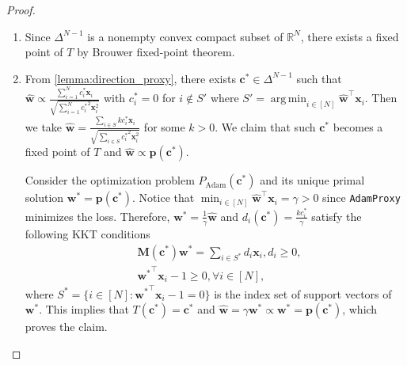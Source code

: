 \documentclass{article} %
\theoremstyle{plain}
\theoremstyle{definition}
\theoremstyle{remark}
\newcommand{\R}{\mathbb{R}}
\DeclareMathOperator*{\argmin}{arg\,min}
\def\bx{{\mathbf x}}
\def\bc{{\mathbf c}}
\def\bp{{\mathbf p}}
\def\bw{{\mathbf w}}
\def\bd{{\mathbf d}}
\def\bM{{\mathbf M}}
\begin{document}
\begin{proof}
\begin{enumerate}[label=(\alph*)]
    Let $\mathbf{X}$ be a matrix whose columns are the support vectors of $\bw^*$. On $\bc\in \Delta^{N-1} \cap B_{\delta}(\bc_0)$, KKT conditions tells us that
    \begin{align*}
        \bM(\mathbf{c})\bp(\mathbf{c}) = \sum_{i \in S(\bp(\bc))} d_i(\bc) \bx_i \overset{(*)}{=} \sum_{i \in S(\bw^*)} d_i(\bc) \bx_i =\mathbf{X}\bd(\bc) \\
        \overset{(**)}{\Leftrightarrow} \bd(\bc) = (\mathbf{X}^\top|_{\operatorname{im}\mathbf{X}^\top})^{-1}\bM(\mathbf{c})\mathbf{p}(\mathbf{c}),
    \end{align*}
    where $(*)$ is from $S(\bp(\bc)) \subseteq S(\bw^*)$ and $(**)$ is from the linear independence of columns of $\mathbf{X}$. Notice that $\bM(\bc)$ and $\bw^*(\bc)$ are continuous on $\bc = \bc_0$, which implies that $\bd(\bc)$ is continuous on $\bc = \bc_0$.
    
    Since at least one of the dual solutions is strictly positive, $\bd$ is a continuous map from $\Delta^{N-1}$ to $\mathbb{R}_{\geq0}^N\backslash\{\mathbf{0}\}$. This implies that $T$ is continuous, since $\mathbf{d} \mapsto \frac{\mathbf{d}}{\sum_{i \in [N]} d_i}$ is continuous on $\mathbb{R}_{\geq0}^N\backslash\{\mathbf{0}\}$.

    \item Since $\Delta^{N-1}$ is a nonempty convex compact subset of $\R^N$, there exists a fixed point of $T$ by Brouwer fixed-point theorem.

    \item From \cref{lemma:direction_proxy}, there exists $\bc^* \in \Delta^{N-1}$ such that $\hat{\bw} \propto \frac{\sum_{i=1}^N c_i^*\bx_i}{\sqrt{\sum_{i=1}^N {c_i^*}^2 \bx_i^2}}$ with $c_i^*=0$ for $i \notin S'$ where $S'= \argmin_{i \in [N]}\hat{\bw}^\top \bx_i$. Then we take $\hat{\mathbf{w}} =\frac{\sum_{i \in S}kc^*_i \mathbf{x}_i}{\sqrt{\sum_{i \in S}{c_i^*}^2 \mathbf{x}_i^2}}$ for some $k>0$. We claim that such $\bc^*$ becomes a fixed point of $T$ and $\hat{\bw} \propto \bp(\bc^*)$. 
    
    Consider the optimization problem $P_{\text{Adam}}(\bc^*)$ and its unique primal solution $\bw^*=\bp(\bc^*)$. Notice that $\min_{i \in[N]}{\hat{\bw}}^\top\bx_i = \gamma>0$ since \texttt{AdamProxy} minimizes the loss. Therefore, $\bw^*=\frac{1}{\gamma}\hat{\bw}$ and $d_i(\bc^*)=\frac{kc_i^*}{\gamma}$ satisfy the following KKT conditions
    \begin{align*}
        &\bM(\mathbf{c}^*)\mathbf{w}^*=\sum_{i \in S^*}d_i\mathbf{x}_i, d_i \geq 0, \\
        &{\mathbf{w}^*}^\top \mathbf{x}_i -1 \geq 0, \forall i \in [N],
    \end{align*}
    where $S^*=\{i \in [N]:{\bw^*}^\top\bx_i-1=0\}$ is the index set of support vectors of $\bw^*$. This implies that $T(\bc^*)=\bc^*$ and $\hat{\bw}=\gamma \bw^* \propto \bw^*=\bp(\bc^*)$, which proves the claim.
    \end{enumerate}
\end{proof}
\end{document}
